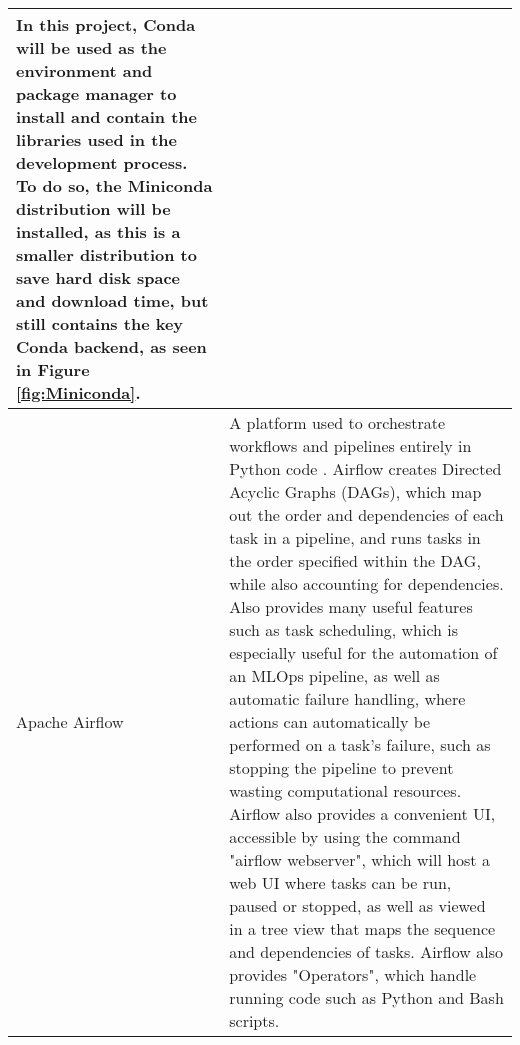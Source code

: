 \begin{longtable}{ |p{}| p{}|}
    In this project, Conda will be used as the environment and package manager to install and contain the 
    libraries used in the development process. To do so, the Miniconda distribution will be installed, as 
    this is a smaller distribution to save hard disk space and download time, but still contains the key 
    Conda backend, as seen in Figure \ref{fig:Miniconda}. \\
    \hline
    Apache Airflow &
    A platform used to orchestrate workflows and pipelines entirely in Python code \autocite{apache_use_nodate}.
    Airflow creates Directed Acyclic Graphs (DAGs), which map out the order and dependencies of each task in a 
    pipeline, and runs tasks in the order specified within the DAG, while also accounting for dependencies.
    Also provides many useful features such as task scheduling, which is especially useful for the automation 
    of an MLOps pipeline, as well as automatic failure handling, where actions can automatically be performed 
    on a task's failure, such as stopping the pipeline to prevent wasting computational resources. Airflow 
    also provides a convenient UI, accessible by using the command "airflow webserver", which will host a 
    web UI where tasks can be run, paused or stopped, as well as viewed in a tree view that maps the 
    sequence and dependencies of tasks. Airflow also provides "Operators", which handle running code such 
    as Python and Bash scripts.


\end{longtable}
